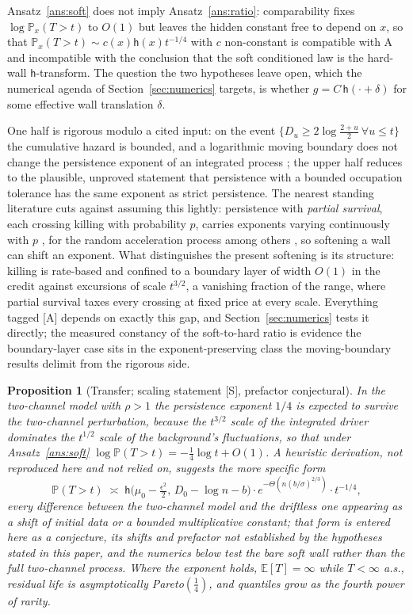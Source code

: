 \documentclass[11pt]{article}
\newtheorem{proposition}[theorem]{Proposition}
\theoremstyle{definition}
\theoremstyle{remark}
\newcommand{\PP}{\mathbb{P}}
\newcommand{\E}{\mathbb{E}}
\newcommand{\hm}{\mathsf{h}}
\begin{document}
\noindent Ansatz~\ref{ans:soft} does not imply Ansatz~\ref{ans:ratio}:
comparability fixes $\log\PP_x(T>t)$ to $O(1)$ but leaves the hidden
constant free to depend on $x$, so that $\PP_x(T>t)\sim c(x)\hm(x)t^{-1/4}$
with $c$ non-constant is compatible with A and incompatible with the
conclusion that the soft conditioned law is the hard-wall
$\hm$-transform. The question the two hypotheses leave open, which
the numerical agenda of Section~\ref{sec:numerics} targets, is
whether $g=C\,\hm(\cdot+\delta)$ for some effective wall translation
$\delta$.

One half is rigorous modulo a cited input: on the event
$\{D_u\ge2\log\frac{2+u}{2}\ \forall u\le t\}$ the cumulative hazard
is bounded, and a logarithmic moving boundary does not change the
persistence exponent of an integrated process \cite{AS15,DW15}; the
upper half reduces to the plausible, unproved statement that
persistence with a bounded occupation tolerance has the same exponent
as strict persistence. The nearest standing literature cuts against
assuming this lightly: persistence with \emph{partial survival}, each crossing killing with probability $p$, carries exponents
varying continuously with $p$ \cite{MB98}, for the random acceleration
process among others \cite{Bur14}, so softening a wall can shift an
exponent. What distinguishes the present softening is its structure:
killing is rate-based and confined to a boundary layer of width $O(1)$
in the credit against excursions of scale $t^{3/2}$, a vanishing
fraction of the range, where partial survival taxes every crossing
at fixed price at every scale. Everything tagged [A] depends on exactly
this gap, and Section~\ref{sec:numerics} tests it directly; the
measured constancy of the soft-to-hard ratio is evidence the
boundary-layer case sits in the exponent-preserving class the
moving-boundary results delimit from the rigorous side.

\begin{proposition}[Transfer; scaling statement {[S]}, prefactor
conjectural]\label{thm:transfer}
In the two-channel model with $\rho>1$ the persistence exponent
$1/4$ is expected to survive the two-channel perturbation, because
the $t^{3/2}$ scale of the integrated driver dominates the $t^{1/2}$
scale of the background's fluctuations, so that under
Ansatz~\ref{ans:soft} $\log\PP(T>t)=-\tfrac14\log t+O(1)$. A heuristic derivation, not reproduced here and not relied on, suggests
the more specific form
\begin{equation}\label{eq:transfer}
\PP(T>t)\;\asymp\;
\hm\bigl(\mu_0-\tfrac{\epsilon^2}{2},\,D_0-\log n-b\bigr)\cdot
e^{-\Theta(n(b/\sigma)^{2/3})}\cdot t^{-1/4},
\end{equation}
every difference between the two-channel model and the driftless one
appearing as a shift of initial data or a bounded multiplicative
constant; that form is entered here as a conjecture, its shifts and
prefactor not established by the hypotheses stated in this paper, and
the numerics below test the bare soft wall rather than the full
two-channel process. Where the exponent holds, $\E[T]=\infty$ while
$T<\infty$ a.s., residual life is asymptotically Pareto$(\tfrac14)$,
and quantiles grow as the fourth power of rarity.
\end{proposition}
\end{document}
